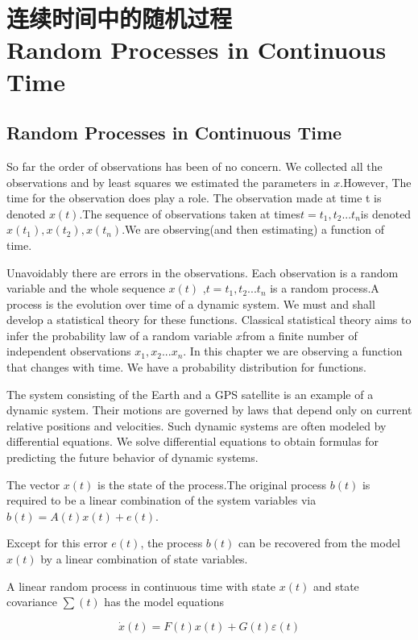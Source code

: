 \section[连续时间中的随机过程]{连续时间中的随机过程\\Random Processes in Continuous Time}
	\subsection{Random Processes in Continuous Time}
	So far the order of observations has been of no concern. We collected all the observations and by least squares we estimated the parameters in $ x $.However, The time for the observation does play a role. The observation made at time t is denoted $ x(t) $.The sequence of observations taken at times$ t=t_{1},t_{2}...t_{n} $is denoted $ x(t_{1}),x(t_{2}),x(t_{n}) $.We are observing(and then estimating) a function of time.
	
	 Unavoidably there are errors in the observations. Each observation is a random variable and the whole sequence $ x(t) $ ,$ t=t_{1},t_{2}...t_{n} $ is a random process.A process is the evolution over time of a dynamic system. We must and shall develop a statistical theory for these functions. Classical statistical theory aims to infer the probability law of a random variable $ x $from a finite number of independent observations $ x_{1},x_{2}...x_{n} $. In this chapter we are observing a function that changes with time. We have a probability distribution for functions. 
	 
	 The system consisting of the Earth and a GPS satellite is an example of a dynamic system. Their motions are governed by laws that depend only on current relative positions and velocities. Such dynamic systems are often modeled by differential equations. We solve differential equations to obtain formulas for predicting the future behavior of dynamic systems. 
	 
	 The vector $ x(t) $ is the state of the process.The original process $ b(t) $ is required to be a linear combination of the system variables via $ b(t)=A(t)x(t)+e(t) $.
	 
	 Except for this error $ e(t) $, the process $ b(t) $ can be recovered from the model $ x(t) $ by a linear combination of state variables. 
	 
	  A linear random process in continuous time with state $ x(t) $  and state covariance $ \sum(t) $ has the model equations
	  
	  \begin{equation}\label{5.1}
	   \dot{x}(t)=F(t)x(t)+G(t)\varepsilon(t)
	  \end{equation}
	  
